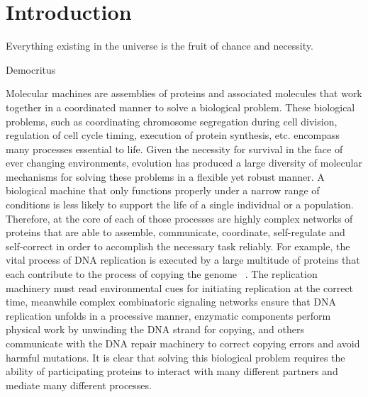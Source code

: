 \chapter{Introduction}


\epigraph{Everything existing in the universe is the fruit of chance and necessity.}{Democritus}

Molecular  machines  are  assemblies of proteins and associated molecules that  work together  in a coordinated manner  to solve a biological problem.  These biological problems, such as coordinating chromosome segregation  during cell division, regulation of cell cycle timing, execution of protein  synthesis, etc.  encompass many processes essential to life. Given the necessity for survival in the face of ever changing environments,  evolution has produced a large diversity of molecular mechanisms for solving these problems in a flexible yet robust  manner.  A biological machine that  only functions properly under a narrow range of  conditions is less likely to support the life of a single individual or a population.  Therefore,  at the core of each of those processes are highly complex networks of proteins that  are able to assemble, communicate, coordinate,  self-regulate and self-correct in order to accomplish the necessary task reliably.  For example, the vital process of DNA replication is executed by a large multitude of proteins that  each contribute to the process of copying the genome ~\cite{bell2002dna}. The replication  machinery must read environmental  cues for initiating  replication  at the correct time, meanwhile complex combinatoric  signaling networks ensure that  DNA replication  unfolds in a processive manner,  enzymatic components  perform physical work by unwinding the DNA strand  for copying, and others  communicate  with theDNA repair machinery  to correct copying errors and avoid harmful mutations. It is clear that  solving this biological problem requires the ability of participating proteins to interact  with many different partners  and mediate  many different processes.


